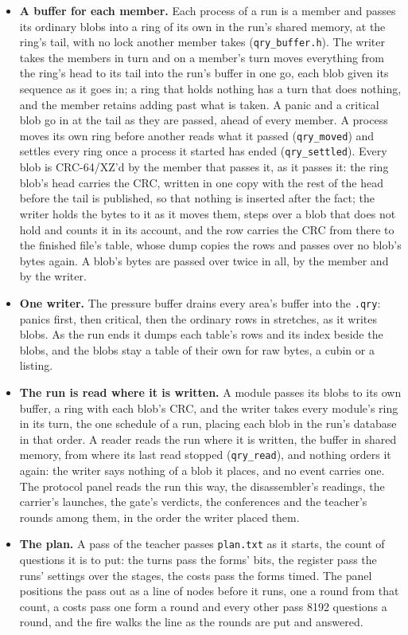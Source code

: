 \begin{itemize}
\item \textbf{A buffer for each member.} Each process of a run is a member and passes its ordinary blobs into a ring of its own in the run's shared memory, at the ring's tail, with no lock another member takes (\texttt{qry\_\allowbreak{}buffer.\allowbreak{}h}). The writer takes the members in turn and on a member's turn moves everything from the ring's head to its tail into the run's buffer in one go, each blob given its sequence as it goes in; a ring that holds nothing has a turn that does nothing, and the member retains adding past what is taken. A panic and a critical blob go in at the tail as they are passed, ahead of every member. A process moves its own ring before another reads what it passed (\texttt{qry\_\allowbreak{}moved}) and settles every ring once a process it started has ended (\texttt{qry\_\allowbreak{}settled}). Every blob is CRC-64/XZ'd by the member that passes it, as it passes it: the ring blob's head carries the CRC, written in one copy with the rest of the head before the tail is published, so that nothing is inserted after the fact; the writer holds the bytes to it as it moves them, steps over a blob that does not hold and counts it in its account, and the row carries the CRC from there to the finished file's table, whose dump copies the rows and passes over no blob's bytes again. A blob's bytes are passed over twice in all, by the member and by the writer.
\item \textbf{One writer.} The pressure buffer drains every area's buffer into the \texttt{.\allowbreak{}qry}: panics first, then critical, then the ordinary rows in stretches, as it writes blobs. As the run ends it dumps each table's rows and its index beside the blobs, and the blobs stay a table of their own for raw bytes, a cubin or a listing.
\item \textbf{The run is read where it is written.} A module passes its blobs to its own buffer, a ring with each blob's CRC, and the writer takes every module's ring in its turn, the one schedule of a run, placing each blob in the run's database in that order. A reader reads the run where it is written, the buffer in shared memory, from where its last read stopped (\texttt{qry\_\allowbreak{}read}), and nothing orders it again: the writer says nothing of a blob it places, and no event carries one. The protocol panel reads the run this way, the disassembler's readings, the carrier's launches, the gate's verdicts, the conferences and the teacher's rounds among them, in the order the writer placed them.
\item \textbf{The plan.} A pass of the teacher passes \texttt{plan.\allowbreak{}txt} as it starts, the count of questions it is to put: the turns pass the forms' bits, the register pass the runs' settings over the stages, the costs pass the forms timed. The panel positions the pass out as a line of nodes before it runs, one a round from that count, a costs pass one form a round and every other pass 8192 questions a round, and the fire walks the line as the rounds are put and answered.

\end{itemize}
